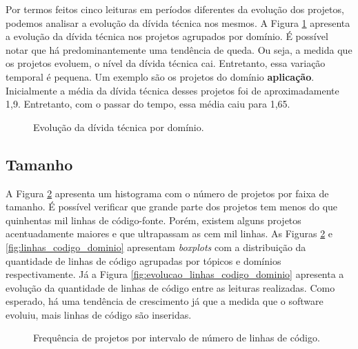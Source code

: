 Por termos feitos cinco leituras em períodos diferentes da evolução dos projetos, podemos analisar a evolução da dívida técnica nos mesmos. A Figura \ref{fig:evolucao_por_dominio} apresenta a evolução da dívida técnica nos projetos agrupados por domínio. É possível notar que há predominantemente uma tendência de queda. Ou seja, a medida que os projetos evoluem, o nível da dívida técnica cai. Entretanto, essa variação temporal é pequena.  Um exemplo são os projetos do domínio \textbf{aplicação}. Inicialmente a média da dívida técnica desses projetos foi de aproximadamente 1,9. Entretanto, com o passar do tempo, essa média caiu para 1,65. 



 \begin{figure}[H]
  \centering
  \caption{Evolução da dívida técnica por domínio.}
  \label{fig:evolucao_por_dominio} 
\end{figure}



\subsection{Tamanho}

A Figura \ref{fig:histograma_nloc} apresenta um histograma com o número de projetos por faixa de tamanho. É possível verificar que grande parte dos projetos tem menos do que quinhentas mil linhas de código-fonte. Porém, existem alguns projetos acentuadamente maiores e que ultrapassam as cem mil linhas. As Figuras \ref{fig:histograma_nloc} e \ref{fig:linhas_codigo_dominio} apresentam \textit{boxplots} com a distribuição da quantidade de linhas de código agrupadas por tópicos e domínios respectivamente. Já a Figura \ref{fig:evolucao_linhas_codigo_dominio} apresenta a evolução da quantidade de linhas de código entre as leituras realizadas. Como esperado, há uma tendência de crescimento já que a medida que o software evoluiu, mais linhas de código são inseridas. 


 \begin{figure}[H]
  \centering
  \caption{Frequência de projetos por intervalo de número de linhas de código.}
  \label{fig:histograma_nloc} 
\end{figure}



